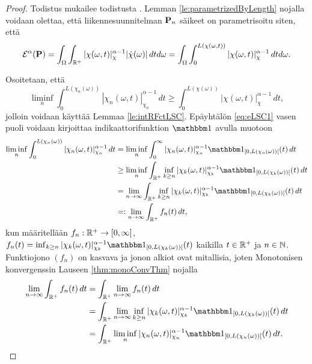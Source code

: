 \documentclass[12pt,oneside,a4paper]{amsbook} %
\begin{document}
\begin{proof}
    Todistus mukailee todistusta \cite[s. 37]{optimal}. Lemman \ref{le:parametrizedByLength} nojalla voidaan olettaa, että liikennesuunnitelman $\P_n$ säikeet on parametrisoitu siten, että 
    \begin{equation}
         \E^\alpha(\P) = \int_\Omega \int_{\R^+}|\chi(\omega, t)|^{\alpha-1}_\chi|\dot\chi(\omega)| \, dtd\omega = \int_\Omega \int_{0}^{L(\chi(\omega, t))}|\chi(\omega, t)|^{\alpha-1}_\chi \, dtd\omega.
    \end{equation}
    
    Osoitetaan, että
    \begin{equation}\label{eq:eLSC1}
      \liminf_{n} \int_0^{L(\chi_n(\omega))}|\chi_n(\omega, t)|_{\chi_n}^{\alpha-1}\, dt \ge \int_0^{L(\chi(\omega))}|\chi(\omega, t)|_{\chi}^{\alpha-1} \, dt,
    \end{equation}
    jolloin voidaan käyttää Lemmaa \ref{le:intRFctLSC}.
    Epäyhtälön \eqref{eq:eLSC1} vasen puoli voidaan kirjoittaa indikaattorifunktion $\indfct{}$ avulla muotoon
    \begin{align*}
        \liminf_{n} \int_0^{L(\chi_n(\omega))} |\chi_n(\omega, t)|_{\chi_n}^{\alpha-1} \, dt &= \liminf_{n} \int_0^\infty |\chi_n(\omega, t)|_{\chi_n}^{\alpha-1} \indfct{[0,L(\chi_n(\omega))[}(t) \, dt \\
        &\ge \liminf_n \int_\Rp \inf_{k \ge n} |\chi_k(\omega, t)|_{\chi_k}^{\alpha-1} \indfct{[0, L(\chi_k(\omega))[}(t) \, dt \\
        &=\lim_{n\to \infty} \int_\Rp \inf_{k \ge n} |\chi_k(\omega, t)|_{\chi_k}^{\alpha-1} \indfct{[0, L(\chi_k(\omega))[}(t) \, dt \\
        &=: \lim_{n \to \infty}  \int_\Rp f_n(t) \, dt,
    \end{align*}
    kun määritellään $f_n: \Rp \to [0, \infty]$, $f_n(t) = \inf_{k \ge n} |\chi_k(\omega, t)|_{\chi_k}^{\alpha-1} \indfct{[0, L(\chi_k(\omega))[}(t)$ kaikilla $t \in \Rp$ ja $n \in \N$. Funktiojono $(f_n)$ on kasvava ja jonon alkiot ovat mitallisia, joten Monotonisen konvergenssin Lauseen \ref{thm:monoConvThm} nojalla 
    \begin{align*}
        \lim_{n \to \infty}  \int_\Rp f_n(t) \, dt &= \int_\Rp \lim_{n\to\infty}f_n(t) \, dt \\
        &= \int_\Rp \lim_{n \to \infty}  \inf_{k \ge n} |\chi_k(\omega, t)|_{\chi_k}^{\alpha-1} \indfct{[0, L(\chi_k(\omega))[}(t) \, dt \\
        &= \int_\Rp \liminf_{n} |\chi_n(\omega, t)|_{\chi_n}^{\alpha-1} \indfct{[0, L(\chi_n(\omega))[}(t) \, dt.

\end{align*}
\end{proof}
\end{document}

